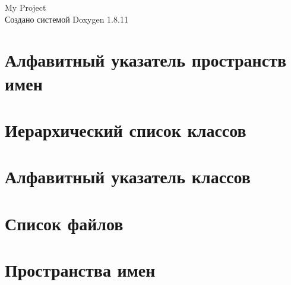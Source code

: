 \documentclass[twoside]{book}
\newcommand{\+}{\discretionary{\mbox{\scriptsize$\hookleftarrow$}}{}{}}
\newcommand{\clearemptydoublepage}{%
  \newpage{\pagestyle{empty}\cleardoublepage}%
}
\begin{document}
\hypersetup{pageanchor=false,
             bookmarksnumbered=true,
             pdfencoding=unicode
            }
\begin{titlepage}
\vspace*{7cm}
\begin{center}%
{\Large My Project }\\
\vspace*{1cm}
{\large Создано системой Doxygen 1.8.11}\\
\end{center}
\end{titlepage}
\clearemptydoublepage
\tableofcontents
\clearemptydoublepage
{}
\hypersetup{pageanchor=true}

\chapter{Алфавитный указатель пространств имен}

\chapter{Иерархический список классов}

\chapter{Алфавитный указатель классов}

\chapter{Список файлов}

\chapter{Пространства имен}











\end{document}
